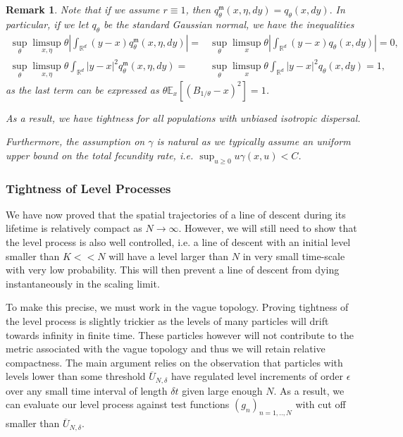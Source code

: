 \documentclass[12pt]{article}
\newtheorem{remark}[theorem]{Remark}
\newcommand{\IR}{\mathbb R}
\begin{document}
\begin{remark}
Note that if we assume $r \equiv 1$, then 
$q^{\mathfrak{m}}_{\theta}(x,\eta,dy)=q_{\theta}(x,dy).$
In particular, if we let $q_{\theta}$ be the standard Gaussian normal, we have the inequalities
\begin{align}
   \sup_{\theta}\limsup_{x, \eta} \theta \left| \int_{\IR^d} (y-x) q^{\mathfrak{m}}_{ \theta}(x,\eta,dy) \right| =& \sup_{\theta}\limsup_{x} \theta \left| \int_{\IR^d} (y-x) q_{\theta}(x,dy) \right| =  0,\\
   \sup_{\theta}\limsup_{x, \eta} \theta \int_{\IR^d} |y-x|^2 q^{\mathfrak{m}}_{ \theta}(x,\eta,dy)  =& \sup_{\theta}\limsup_{x} \theta \int_{\IR^d} |y-x|^2 q_{\theta}(x,dy) =  1,
\end{align}
as the last term can be expressed as $\theta \mathbb{E}_{x}[(B_{1/\theta}-x)^2]=1$.

As a result, we have tightness for all populations with unbiased isotropic dispersal.

Furthermore, the assumption on $\gamma$ is natural as we typically assume an uniform upper bound on the total fecundity rate, i.e.
$\sup_{u \geq 0} u\gamma(x,u) < C$.
\end{remark}


\subsubsection{Tightness of Level Processes}
We have now proved that the spatial trajectories of a line of descent during its lifetime is relatively compact as $N \to \infty$. However, we will still need to show that the level process is also well controlled, i.e. a line of descent with an initial level smaller than $K << N$ will have a level larger than $N$ in very small time-scale with very low probability. This will then prevent a line of descent from dying instantaneously in the scaling limit.

To make this precise, we must work in the vague topology. Proving tightness of the level process is slightly trickier as the levels of many particles will drift towards infinity in finite time. These particles however will not contribute to the metric associated with the vague topology and thus we will retain relative compactness. The main argument relies on the observation that particles with levels lower than some threshold $\overline{U}_{N, \delta}$  have regulated level increments of order $\epsilon$ over any small time interval of length $\delta t$ given large enough $N$. As a result, we can evaluate our level process against test functions $(g_n)_{n=1,..,N}$ with cut off smaller than $\overline{U}_{N, \delta}$. 
\end{document}
